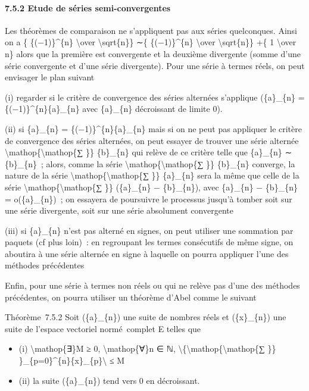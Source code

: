 \documentclass[]{article}
\begin{document}
\paragraph{7.5.2 Etude de séries semi-convergentes}

Les théorèmes de comparaison ne s'appliquent pas aux séries quelconques.
Ainsi on a \{ \{(−1)\}\^{}\{n\} \textbackslash{}over
\textbackslash{}sqrt\{n\}\} ∼\{ \{(−1)\}\^{}\{n\} \textbackslash{}over
\textbackslash{}sqrt\{n\}\} +\{ 1 \textbackslash{}over n\} alors que la
première est convergente et la deuxième divergente (somme d'une série
convergente et d'une série divergente). Pour une série à termes réels,
on peut envisager le plan suivant

(i) regarder si le critère de convergence des séries alternées
s'applique (\{a\}\_\{n\} =
\{(−1)\}\^{}\{n\}\textbar{}\{a\}\_\{n\}\textbar{} avec
\textbar{}\{a\}\_\{n\}\textbar{} décroissant de limite 0).

(ii) si \{a\}\_\{n\} = \{(−1)\}\^{}\{n\}\textbar{}\{a\}\_\{n\}\textbar{}
mais si on ne peut pas appliquer le critère de convergence des séries
alternées, on peut essayer de trouver une série alternée
\textbackslash{}mathop\{\textbackslash{}mathop\{∑ \}\} \{b\}\_\{n\} qui
relève de ce critère telle que \{a\}\_\{n\} ∼ \{b\}\_\{n\}~; alors,
comme la série \textbackslash{}mathop\{\textbackslash{}mathop\{∑ \}\}
\{b\}\_\{n\} converge, la nature de la série
\textbackslash{}mathop\{\textbackslash{}mathop\{∑ \}\} \{a\}\_\{n\} sera
la même que celle de la série
\textbackslash{}mathop\{\textbackslash{}mathop\{∑ \}\} (\{a\}\_\{n\} −
\{b\}\_\{n\}), avec \{a\}\_\{n\} − \{b\}\_\{n\} = o(\{a\}\_\{n\})~; on
essayera de poursuivre le processus jusqu'à tomber soit sur une série
divergente, soit sur une série absolument convergente

(iii) si \{a\}\_\{n\} n'est pas alterné en signes, on peut utiliser une
sommation par paquets (cf plus loin)~: en regroupant les termes
consécutifs de même signe, on aboutira à une série alternée en signe à
laquelle on pourra appliquer l'une des méthodes précédentes

Enfin, pour une série à termes non réels ou qui ne relève pas d'une des
méthodes précédentes, on pourra utiliser un théorème d'Abel comme le
suivant

Théorème~7.5.2 Soit (\{a\}\_\{n\}) une suite de nombres réels et
(\{x\}\_\{n\}) une suite de l'espace vectoriel normé~complet E telles
que

\begin{itemize}
\itemsep1pt\parskip0pt
\item
  (i) \textbackslash{}mathop\{∃\}M ≥ 0, \textbackslash{}mathop\{∀\}n ∈
  ℕ,
  \textbackslash{}\textbar{}\{\textbackslash{}mathop\{\textbackslash{}mathop\{∑
  \}\} \}\_\{p=0\}\^{}\{n\}\{x\}\_\{p\}\textbackslash{}\textbar{} ≤ M
\item
  (ii) la suite (\{a\}\_\{n\}) tend vers 0 en décroissant.
\end{itemize}
\end{document}

